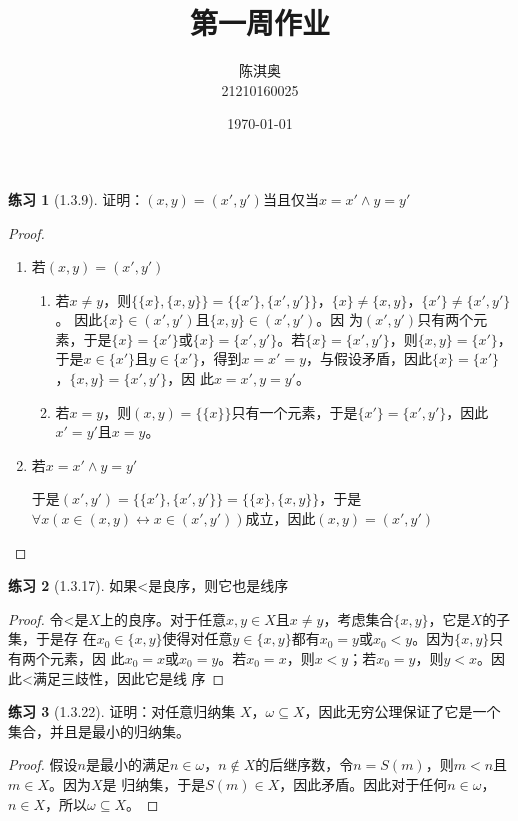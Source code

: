 \documentclass[11pt]{article}
\author{陈淇奥\\21210160025}
\date{\today}
\title{第一周作业}
\theoremstyle{definition}
\newtheorem{exercise}{练习}
\begin{document}
\maketitle
\begin{exercise}[1.3.9]
证明：\((x,y)=(x',y')\)当且仅当\(x=x'\wedge y=y'\)
\end{exercise}

\begin{proof}
\begin{enumerate}
\item 若\((x,y)=(x',y')\)
\begin{enumerate}
\item 若\(x\neq y\)，则\(\{\{x\},\{x,y\}\}=\{\{x'\},\{x',y'\}\}\)，\(\{x\}\neq\{x,y\}\)，\(\{x'\}\neq\{x',y'\}\)。
因此\(\{x\}\in(x',y')\)且\(\{x,y\}\in(x',y')\)。因
为\((x',y')\)只有两个元素，于是\(\{x\}=\{x'\}\)或\(\{x\}=\{x',y'\}\)。若\(\{x\}=\{x',y'\}\)，则\(\{x,y\}=\{x'\}\)，
于是\(x\in\{x'\}\)且\(y\in\{x'\}\)，得到\(x=x'=y\)，与假设矛盾，因此\(\{x\} =\{x'\}\)，\(\{x,y\} =\{x',y'\}\)，因
此\(x=x',y=y'\)。
\item 若\(x=y\)，则\((x,y) =\{\{x\}\}\)只有一个元素，于是\(\{x'\} =\{x',y'\}\)，因此\(x'=y'\)且\(x=y\)。
\end{enumerate}
\item 若\(x=x'\wedge y=y'\)

于是\((x',y')=\{\{x'\},\{x',y'\}\}=\{\{x\},\{x,y\}\}\)，于是\(\forall x(x\in(x,y)\leftrightarrow x\in(x',y'))\)成立，因此\((x,y)=(x',y')\)
\end{enumerate}
\end{proof}

\begin{exercise}[1.3.17]
如果<是良序，则它也是线序
\end{exercise}

\begin{proof}
令<是\(X\)上的良序。对于任意\(x,y\in X\)且\(x\neq y\)，考虑集合\(\{x,y\}\)，它是\(X\)的子集，于是存
在\(x_0\in\{x,y\}\)使得对任意\(y\in\{x,y\}\)都有\(x_0=y\)或\(x_0<y\)。因为\(\{x,y\}\)只有两个元素，因
此\(x_0=x\)或\(x_0=y\)。若\(x_0=x\)，则\(x<y\)；若\(x_0=y\)，则\(y<x\)。因此<满足三歧性，因此它是线
序
\end{proof}

\begin{exercise}[1.3.22]
证明：对任意归纳集 \(X\)，\(\omega\subseteq X\)，因此无穷公理保证了它是一个集合，并且是最小的归纳集。
\end{exercise}

\begin{proof}
假设\(n\)是最小的满足\(n\in\omega\)，\(n\not\in X\)的后继序数，令\(n=S(m)\)，则\(m<n\)且\(m\in X\)。因为\(X\)是
归纳集，于是\(S(m)\in X\)，因此矛盾。因此对于任何\(n\in\omega\)，\(n\in X\)，所以\(\omega\subseteq X\)。
\end{proof}
\end{document}
